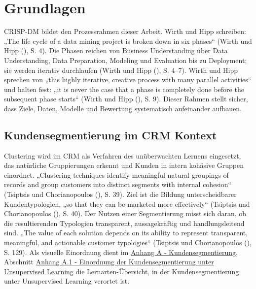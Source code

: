 \documentclass[
  11pt,
  openany, oneside]{book}
\begin{document}
\chapter{Grundlagen}\label{sec-grundlagen}

CRISP-DM bildet den Prozessrahmen dieser Arbeit. Wirth und Hipp
schreiben: „The life cycle of a data mining project is broken down in
six phases`` (Wirth und Hipp
(), S. 4). Die
Phasen reichen von Business Understanding über Data Understanding, Data
Preparation, Modeling und Evaluation bis zu Deployment; sie werden
iterativ durchlaufen (Wirth und Hipp
(), S. 4--7). Wirth
und Hipp sprechen von „this highly iterative, creative process with many
parallel activities`` und halten fest: „it is never the case that a
phase is completely done before the subsequent phase starts`` (Wirth und
Hipp (), S. 9).
Dieser Rahmen stellt sicher, dass Ziele, Daten, Modelle und Bewertung
systematisch aufeinander aufbauen.

\section{Kundensegmentierung im CRM
Kontext}\label{sec-kundensegmentierung}

Clustering wird im CRM als Verfahren des unüberwachten Lernens
eingesetzt, das natürliche Gruppierungen erkennt und Kunden in intern
kohäsive Gruppen einordnet. „Clustering techniques identify meaningful
natural groupings of records and group customers into distinct segments
with internal cohesion`` (Tsiptsis und Chorianopoulos
(), S. 39). Ziel
ist die Bildung unterscheidbarer Kundentypologien, „so that they can be
marketed more effectively`` (Tsiptsis und Chorianopoulos
(), S. 40). Der
Nutzen einer Segmentierung misst sich daran, ob die resultierenden
Typologien transparent, aussagekräftig und handlungsleitend sind. „The
value of each solution depends on its ability to represent transparent,
meaningful, and actionable customer typologies`` (Tsiptsis und
Chorianopoulos (),
S. 129). Als visuelle Einordnung dient im \hyperref[sec-anhangA]{Anhang
A - Kundensegmentierung}, Abschnitt \hyperref[sec-anhangA1]{Anhang A.1 -
Einordnung der Kundensegmentierung unter Unsupervised Learning} die
Lernarten-Übersicht, in der Kundensegmentierung unter Unsupervised
Learning verortet ist.
\end{document}
